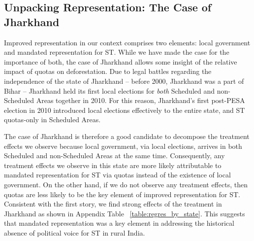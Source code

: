 \documentclass[12pt,reqno]{article}
\begin{document}
\begin{figure}[htbp!]
\end{figure}




\subsection{Unpacking Representation: The Case of Jharkhand\label{jharkhand}}

Improved representation in our context comprises two elements: local government and mandated representation for ST. While we have made the case for the importance of both, the case of Jharkhand allows some insight of the relative impact of quotas on deforestation. Due to legal battles regarding the independence of the state of Jharkhand  -- before 2000, Jharkhand was a part of Bihar -- Jharkhand held its first local elections for \emph{both} Scheduled and non-Scheduled Areas together in 2010. For this reason, Jharkhand's first post-PESA election in 2010 introduced local elections effectively to the entire state, and ST quotas-only in Scheduled Areas. 

The case of Jharkhand is therefore a good candidate to decompose the treatment effects we observe because local government, via local elections, arrives in both Scheduled and non-Scheduled Areas at the same time. Consequently, any treatment effects we observe in this state are more likely attributable to mandated representation for ST via quotas instead of the existence of local government. On the other hand, if we do not observe any treatment effects, then quotas are less likely to be the key element of improved representation for ST. Consistent with the first story, we find strong effects of the treatment in Jharkhand as shown in Appendix Table ~\ref{table:regres_by_state}. This suggests that mandated representation was a key element in addressing the historical absence of political voice for ST in rural India.



\end{document}
